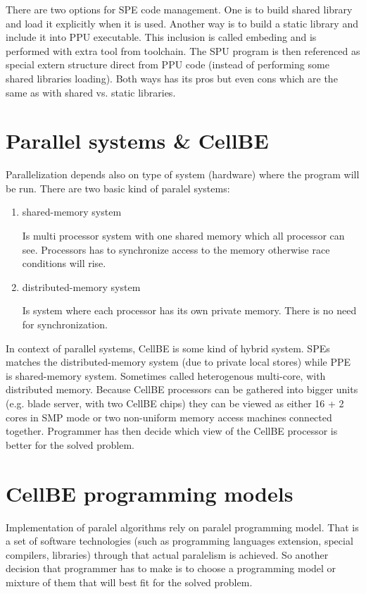 \par
There are two options for SPE code management. One is to build shared library and load it explicitly when it is used. Another way is to build a static library and include it into PPU executable. This inclusion is called embeding and is performed with extra tool from toolchain. The SPU program is then referenced as special extern structure direct from PPU code (instead of performing some shared libraries loading). Both ways has its pros but even cons which are the same as with shared vs. static libraries.

\section{Parallel systems & CellBE}

Parallelization depends also on type of system (hardware) where the program will be run. There are two basic kind of paralel systems:
\begin{enumerate}
\item {shared-memory system}
\par
Is multi processor system with one shared memory which all processor can see. Processors has to synchronize access to the memory otherwise race conditions will rise.

\item {distributed-memory system}
\par
Is system where each processor has its own private memory. There is no need for synchronization.
\end{enumerate}

In context of parallel systems, CellBE is some kind of hybrid system. SPEs matches the distributed-memory system (due to private local stores) while PPE is shared-memory system. Sometimes called heterogenous multi-core, with distributed memory. Because CellBE processors can be gathered into bigger units (e.g. blade server, with two CellBE chips) they can be viewed as either 16 + 2 cores in SMP mode or two non-uniform memory access machines connected together. Programmer has then decide which view of the CellBE processor is better for the solved problem.

\section{CellBE programming models}

Implementation of paralel algorithms rely on paralel programming model. That is a set of software technologies (such as programming languages extension, special compilers, libraries) through that actual paralelism is achieved. So another decision that programmer has to make is to choose a programming model or mixture of them that will best fit for the solved problem.


